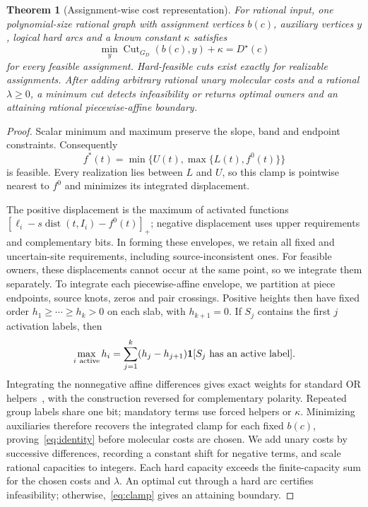 \documentclass[10pt,letterpaper]{article}
\newtheorem{theorem}{Theorem}
\newcommand{\ind}{\mathbf 1}
\newcommand{\dist}{\operatorname{dist}}
\begin{document}
\begin{theorem}[Assignment-wise cost representation]\label{thm:cost}
For rational input, one polynomial-size rational graph with assignment vertices $b(c)$, auxiliary vertices $y$, logical hard arcs and a known constant $\kappa$ satisfies
\begin{equation}
\min_y\operatorname{Cut}_{G_D}(b(c),y)+\kappa=D^\star(c)\label{eq:identity}
\end{equation}
for every feasible assignment. Hard-feasible cuts exist exactly for realizable assignments. After adding arbitrary rational unary molecular costs and a rational $\lambda\ge0$, a minimum cut detects infeasibility or returns optimal owners and an attaining rational piecewise-affine boundary.
\end{theorem}
\begin{proof}
Scalar minimum and maximum preserve the slope, band and endpoint constraints. Consequently
\begin{equation}
f^*(t)=\min\{U(t),\max\{L(t),f^0(t)\}\}\label{eq:clamp}
\end{equation}
is feasible. Every realization lies between $L$ and $U$, so this clamp is pointwise nearest to $f^0$ and minimizes its integrated displacement.

The positive displacement is the maximum of activated functions $[\ell_i-s\dist(t,I_i)-f^0(t)]_+$; negative displacement uses upper requirements and complementary bits. In forming these envelopes, we retain all fixed and uncertain-site requirements, including source-inconsistent ones. For feasible owners, these displacements cannot occur at the same point, so we integrate them separately. To integrate each piecewise-affine envelope, we partition at piece endpoints, source knots, zeros and pair crossings. Positive heights then have fixed order $h_1\ge\cdots\ge h_k>0$ on each slab, with $h_{k+1}=0$. If $S_j$ contains the first $j$ activation labels, then
\begin{equation}
\max_{i\ \mathrm{active}}h_i=\sum_{j=1}^k(h_j-h_{j+1})\ind[S_j\hbox{ has an active label}].\label{eq:layers}
\end{equation}
Integrating the nonnegative affine differences gives exact weights for standard OR helpers~\cite{kz,kohli}, with the construction reversed for complementary polarity. Repeated group labels share one bit; mandatory terms use forced helpers or $\kappa$. Minimizing auxiliaries therefore recovers the integrated clamp for each fixed $b(c)$, proving~\eqref{eq:identity} before molecular costs are chosen. We add unary costs by successive differences, recording a constant shift for negative terms, and scale rational capacities to integers. Each hard capacity exceeds the finite-capacity sum for the chosen costs and $\lambda$. An optimal cut through a hard arc certifies infeasibility; otherwise,~\eqref{eq:clamp} gives an attaining boundary.
\end{proof}
\end{document}
